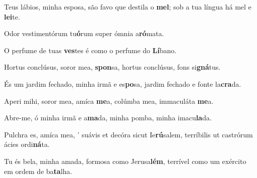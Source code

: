 \begin{greenumerate}
  \switchcolumn%

  \item Teus lábios, minha esposa, são favo que destila o \textbf{mel}; {\GreStar} sob a tua língua há mel e \textbf{lei}te. 

  \switchcolumn*


  \item Odor vestimentórum tu\textbf{ó}rum {\GreStar} super ómnia a\textbf{ró}\-ma\-ta. 

  \switchcolumn%

  \item O perfume de tuas \textbf{ves}tes {\GreStar} é como o perfume do \textbf{Lí}ba\-no. 

  \switchcolumn*


  \item Hortus conclúsus, soror mea, \textbf{spon}sa, {\GreStar} hortus conclúsus, fons si\textbf{gná}tus. 

  \switchcolumn%

  \item És um jardim fechado, minha irmã e es\textbf{po}sa, {\GreStar} jardim fechado e fonte la\textbf{cra}da. 

  \switchcolumn*


  \item Aperi mihi, soror mea, amíca \textbf{me}a, {\GreStar} colúmba mea, immaculáta \textbf{me}a. 

  \switchcolumn%

  \item Abre-me, ó minha irmã e a\textbf{ma}da, {\GreStar} minha pomba, minha imacu\textbf{la}da. 

  \switchcolumn*


  \item Pulchra es, amíca mea, {\large'} suávis et decóra sicut Ie\-\textbf{rú}\-sa\-lem, {\GreStar} terríbilis ut castrórum ácies ordi\textbf{ná}ta. 

  \switchcolumn%

  \item Tu és bela, minha amada, formosa como Jerusa\textbf{lém}, {\GreStar} terrível como um exército em ordem de ba\textbf{ta}lha. 
\end{greenumerate}